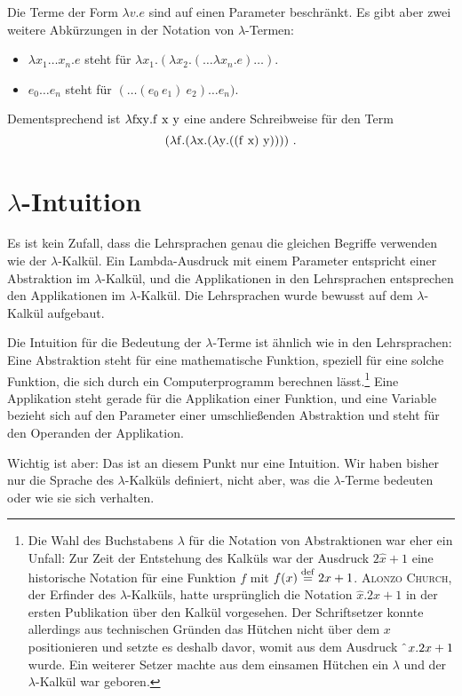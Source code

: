 Die Terme der Form $\lambda v.e$ sind auf einen Parameter
beschränkt.  Es gibt aber zwei weitere Abkürzungen
in der Notation von $\lambda$-Termen:
%
\begin{itemize}
\item $\lambda x_1 \ldots x_n.e$ steht für $\lambda x_1.(\lambda
  x_2.(\ldots\lambda x_n.e)\ldots)$.
\item $e_0 \ldots e_n$ steht für $(\ldots(e_0~e_1)~e_2) \ldots e_n)$.
\end{itemize}
%
Dementsprechend ist $\lambda \mathrm{fxy}.\mathrm f~\mathrm x~\mathrm y$ eine andere Schreibweise für
den Term \[(\lambda \mathrm f.(\lambda \mathrm x.(\lambda \mathrm y.((\mathrm f~\mathrm x)~\mathrm y))))\ .\]

\section{$\lambda$-Intuition}

Es ist kein Zufall, dass die Lehrsprachen genau die gleichen Begriffe verwenden
wie der $\lambda$-Kalkül.  Ein Lambda-Ausdruck mit einem
Parameter entspricht einer Abstraktion im $\lambda$-Kalkül,
und die Applikationen in den Lehrsprachen entsprechen den Applikationen im
$\lambda$-Kalkül.  Die Lehrsprachen wurde bewusst auf dem
$\lambda$-Kalkül aufgebaut.

Die Intuition für die Bedeutung der $\lambda$-Terme ist ähnlich wie in
den Lehrsprachen: Eine Abstraktion steht für eine mathematische Funktion,
speziell für eine solche Funktion, die sich durch ein Computerprogramm
berechnen lässt.\footnote{Die Wahl des Buchstabens $\lambda$ für die
  Notation von Abstraktionen war eher ein Unfall: Zur Zeit der
  Entstehung des Kalküls war der Ausdruck $2\hat{x}+1$ eine historische Notation für eine
  Funktion $f$ mit $f(x)\stackrel{\rm def}{=}{}2x+1$.  \textsc{Alonzo Church},
  der Erfinder des $\lambda$-Kalküls, hatte ursprünglich
  die Notation $\hat{x}.2x+1$ in der ersten Publikation über den
  Kalkül vorgesehen.  Der Schriftsetzer konnte allerdings aus
  technischen Gründen
  das Hütchen nicht über dem $x$ positionieren und setzte es deshalb
  davor, womit aus dem Ausdruck $\hat{~}\thinspace{}x.2x+1$ wurde.  Ein weiterer
  Setzer machte aus dem einsamen Hütchen ein $\lambda$ und der
  $\lambda$-Kalkül war geboren.}  Eine Applikation steht gerade für
die Applikation einer Funktion, und eine Variable bezieht sich auf den
Parameter einer umschließenden Abstraktion und steht für den Operanden
der Applikation.  

Wichtig ist aber: Das ist an diesem Punkt nur eine Intuition.  Wir
haben bisher nur die Sprache des $\lambda$-Kalküls definiert, nicht
aber, was die $\lambda$-Terme bedeuten oder wie sie sich verhalten.

